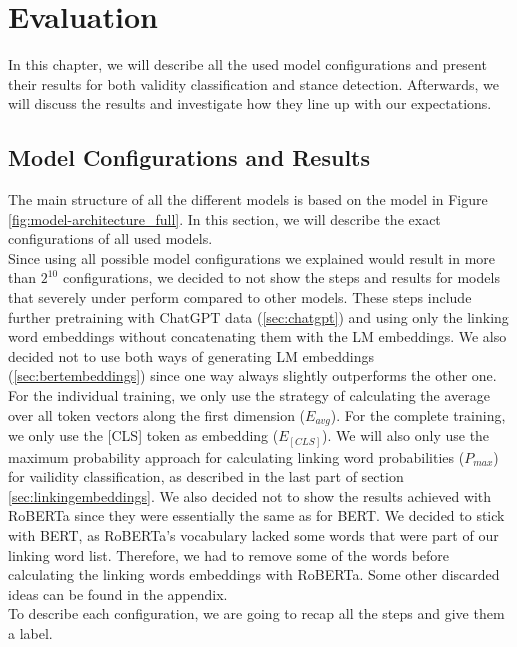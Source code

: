 \section{Evaluation}

In this chapter, we will describe all the used model configurations and present their results for both validity classification and stance detection. Afterwards, we will discuss the results and investigate how they line up with our expectations.

\subsection{Model Configurations and Results}

The main structure of all the different models is based on the model in Figure \ref{fig:model-architecture_full}. In this section, we will describe the exact configurations of all used models. \\
Since using all possible model configurations we explained would result in more than $2^{10}$ configurations, we decided to not show the steps and results for models that severely under perform compared to other models. These steps include further pretraining with ChatGPT data (\ref{sec:chatgpt}) and using only the linking word embeddings without concatenating them with the LM embeddings. We also decided not to use both ways of generating LM embeddings (\ref{sec:bertembeddings}) since one way always slightly outperforms the other one. For the individual training, we only use the strategy of calculating the average over all token vectors along the first dimension ($E_{avg}$). For the complete training, we only use the [CLS] token as embedding ($E_{[CLS]}$). We will also only use the maximum probability approach for calculating linking word probabilities ($P_{max}$) for vailidity classification, as described in the last part of section \ref{sec:linkingembeddings}.
We also decided not to show the results achieved with RoBERTa since they were essentially the same as for BERT. We decided to stick with BERT, as RoBERTa's vocabulary lacked some words that were part of our linking word list. Therefore, we had to remove some of the words before calculating the linking words embeddings with RoBERTa. Some other discarded ideas can be found in the appendix. \\
To describe each configuration, we are going to recap all the steps and give them a label.
